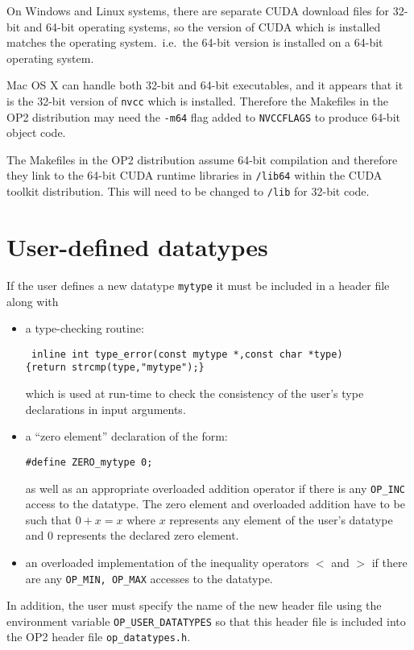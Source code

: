 \documentclass[11pt]{article}
\begin{document}
On Windows and Linux systems, there are separate CUDA download files
for 32-bit and 64-bit operating systems, so the version of CUDA which
is installed matches the operating system.~i.e.~the 64-bit version is
installed on a 64-bit operating system.

Mac OS X can handle both 32-bit and 64-bit executables, and it appears
that it is the 32-bit version of {\tt nvcc} which is installed.  Therefore
the Makefiles in the OP2 distribution may need the {\tt -m64} flag
added to {\tt NVCCFLAGS} to produce 64-bit object code.

The Makefiles in the OP2 distribution assume 64-bit compilation and
therefore they link to the 64-bit CUDA runtime libraries in {\tt /lib64}
within the CUDA toolkit distribution.  This will need to be changed to
{\tt /lib} for 32-bit code.


\newpage

\section{User-defined datatypes}

If the user defines a new datatype {\tt mytype} it must be included in
a header file along with
\begin{itemize}
\item
a type-checking routine:

{\tt
inline int type\_error(const mytype *,const char *type)\\
\{return strcmp(type,"mytype");\}
}

which is used at run-time to check the consistency of the user's type declarations
in input arguments.

\item

a ``zero element'' declaration of the form:

{\tt \#define ZERO\_mytype    0;}

as well as an appropriate overloaded addition operator  if there is any
{\tt OP\_INC} access to the datatype.  The zero element and overloaded
addition have to be such that $0 + x = x$ where $x$ represents any element
of the user's datatype and $0$ represents the declared zero element.

\item

an overloaded implementation of the inequality operators $<$ and $>$
if there are any {\tt OP\_MIN, OP\_MAX} accesses to the datatype.

\end{itemize}

In addition, the user must specify the name of the new header file using the
environment variable {\tt OP\_USER\_DATATYPES}
so that this header file is included into the OP2 header file {\tt op\_datatypes.h}.


\end{document}
